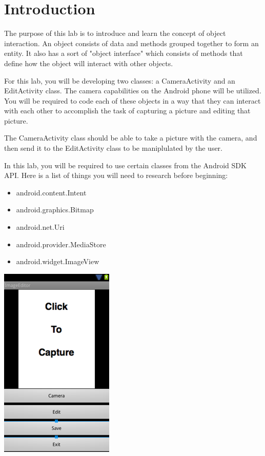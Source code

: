 \section{Introduction}

The purpose of this lab is to introduce and learn the concept of object interaction. An object consists of data and methods grouped together to form an entity. It also has a sort of "object interface" which consists of methods that define how the object will interact with other objects.

\noindent
For this lab, you will be developing two classes: a CameraActivity and an EditActivity class. The camera capabilities on the Android phone will be utilized. You will be required to code each of these objects in a way that they can interact with each other to accomplish the task of capturing a picture and editing that picture.

\noindent
The CameraActivity class should be able to take a picture with the camera, and then send it to the EditActivity class to be maniplulated by the user.

\noindent
In this lab, you will be required to use certain classes from the Android SDK API. Here is a list of things you will need to research before beginning:

\begin{itemize}
	\item android.content.Intent
	\item android.graphics.Bitmap
	\item android.net.Uri
	\item android.provider.MediaStore
	\item android.widget.ImageView
\end{itemize}

\begin{center}
\includegraphics[scale=0.4]{screenshot.png} 
\end{center}
